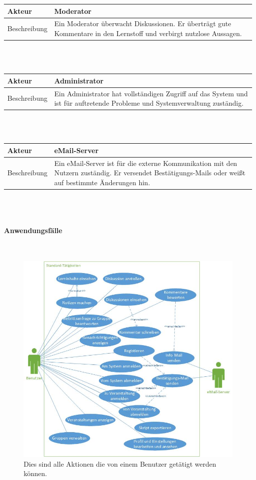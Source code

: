 \documentclass[12pt,a4paper]{article}
\begin{document}
\begin{tabular}{l p{12cm}}
Akteur & \textbf{Moderator} \\ 
\hline Beschreibung & Ein Moderator überwacht Diskussionen. Er überträgt gute Kommentare in den Lernstoff und verbirgt nutzlose Aussagen.\\ 
\end{tabular}\\\\

\begin{tabular}{l p{12cm}}
Akteur & \textbf{Administrator} \\ 
\hline Beschreibung & Ein Administrator hat vollständigen Zugriff auf das System und ist für auftretende Probleme und Systemverwaltung zuständig. \\ 
\end{tabular}\\\\

\begin{tabular}{l p{12cm}}
Akteur & \textbf{eMail-Server} \\ 
\hline Beschreibung & Ein eMail-Server ist für die externe Kommunikation mit den Nutzern zuständig. Er versendet Bestätigungs-Mails oder weißt auf bestimmte Änderungen hin. \\ 
\end{tabular}\\\\

\newpage

\paragraph{Anwendungsfälle}\mbox{}\\

\begin{figure}[H]
	\centering
	\includegraphics[width=\textwidth]{Bilder/Anwendungsfalldiagramme/Benutzer.jpg}
	\caption{Dies sind alle Aktionen die von einem Benutzer getätigt werden können.}
	\label{AwfBenutzer}
\end{figure}
\end{document}
